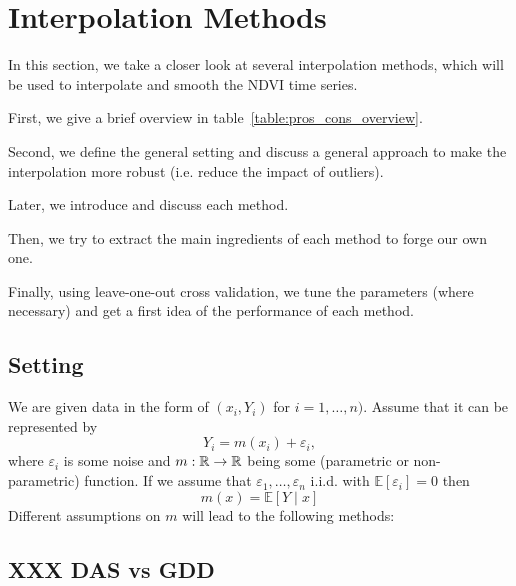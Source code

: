 \newcommand{\RobItPlot}{fitted to different (SCL45) NDVI time series. Iterations of a robustifing refit (as indicated in section~\ref{sec:loess_robustify}) are also displayed}


\chapter{Interpolation Methods}

In this section, we take a closer look at several interpolation methods, which will be used to interpolate and smooth the NDVI time series.

First, we give a brief overview in table~\ref{table:pros_cons_overview}.

Second, we define the general setting and discuss a general approach to make the interpolation more robust (i.e. reduce the impact of outliers).

Later, we introduce and discuss each method.

Then, we try to extract the main ingredients of each method to forge our own one.

Finally, using leave-one-out cross validation, we tune the parameters (where necessary) and get a first idea of the performance of each method.


\footnotesize

\normalsize


\section{Setting}
We are given data in the form of $\left(x_{i}, Y_{i}\right)$ for $i=1, \ldots, n)$. Assume that it can be represented by
$$
	Y_{i}=m\left(x_{i}\right)+\varepsilon_{i},
$$
where $\varepsilon_i$ is some noise and $m: \mathbb{R} \rightarrow \mathbb{R}$ being some (parametric or non-parametric) function. If we assume that $\varepsilon_{1}, \ldots, \varepsilon_{n}$ i.i.d. with $\mathbb{E}\left[\varepsilon_{i}\right]=0$ then $$m(x)=\mathbb{E}[Y \mid x]$$
Different assumptions on $m$ will lead to the following methods:

\section{XXX DAS vs GDD}

